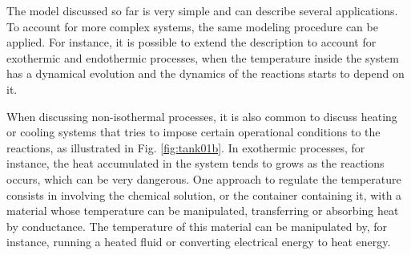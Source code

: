 \documentclass[a4paper,11pt]{book}
\numberwithin{figure}{chapter}
\numberwithin{equation}{chapter}
\numberwithin{table}{chapter}
\theoremstyle{definition}
\begin{document}
The model discussed so far is very simple and can describe several applications. To account for more complex systems, the same modeling procedure can be applied. For instance, it is possible to extend the description to account for exothermic and endothermic processes, when the temperature inside the system has a dynamical evolution and the dynamics of the reactions starts to depend on it.

When discussing non-isothermal processes, it is also common to discuss heating or cooling systems that tries to impose certain operational conditions to the reactions, as illustrated in Fig. \ref{fig:tank01b}. In exothermic processes, for instance, the heat accumulated in the system tends to grows as the reactions occurs, which can be very dangerous. One approach to regulate the temperature consists in involving the chemical solution, or the container containing it, with a material whose temperature can be manipulated, transferring or absorbing heat by conductance. The temperature of this material can be manipulated by, for instance, running a heated fluid or converting electrical energy to heat energy.
\end{document}
